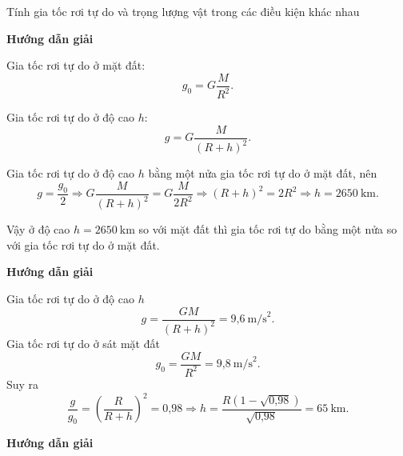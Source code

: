 \begin{dang}{Tính gia tốc rơi tự do và  trọng lượng vật trong các điều kiện khác nhau}
	{	\begin{center}
			\textbf{Hướng dẫn giải}
		\end{center}
		
		Gia tốc rơi tự do ở mặt đất:
		$$g_0 = G \dfrac {M}{R^2}.$$
		
		Gia tốc rơi tự do ở độ cao $h$:
		$$g=G \dfrac {M}{(R+h)^2}.$$
		
		Gia tốc rơi tự do ở độ cao $h$ bằng một nửa gia tốc rơi tự do ở mặt đất, nên
		$$g=\dfrac{g_0}{2} \Rightarrow G \dfrac {M}{(R+h)^2} = G \dfrac {M}{2R^2} \Rightarrow (R+h)^2 = 2 R^2 \Rightarrow h=\SI{2650}{\kilo \meter}.$$
		
		Vậy ở độ cao $h=\SI{2650}{\kilo \meter}$ so với mặt đất thì gia tốc rơi tự do bằng một nửa so với gia tốc rơi tự do ở mặt đất.
		
	}
	{	\begin{center}
			\textbf{Hướng dẫn giải}
		\end{center}
		
		Gia tốc rơi tự do ở độ cao $h$ 
			\begin{equation*}
				g = \dfrac{GM}{(R+h)^2} = \text{9,6}\ \text{m/s}^2.
			\end{equation*}
		Gia tốc rơi tự do ở sát mặt đất 
			\begin{equation*}
				g_0 = \dfrac{GM}{R^2} = \text{9,8}\ \text{m/s}^2.
			\end{equation*}
		Suy ra 
			\begin{equation*}
				\dfrac{g}{g_0}= \left(\dfrac{R}{R+h}\right)^2 =\text{0,98}\Rightarrow h = \dfrac{R(1- \sqrt{\text{0,98}})}{\sqrt {\text{0,98}}} = 65\ \text{km}.
			\end{equation*}
		
	}
	
	{	\begin{center}
			\textbf{Hướng dẫn giải}
		\end{center}
		
}
\end{dang}
